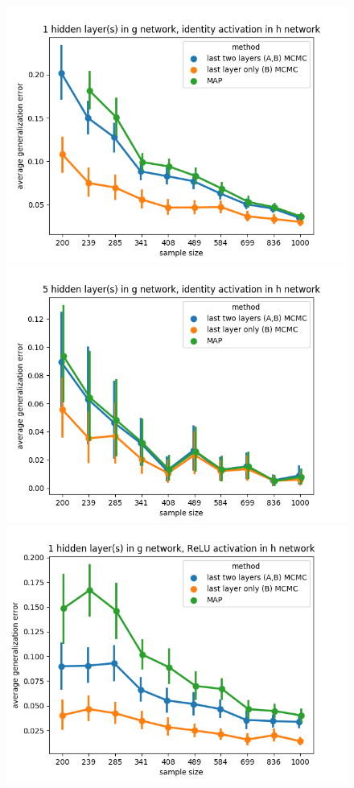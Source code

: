 \documentclass{article} %
\begin{document}
\newpage
\begin{figure}[t!]
	\begin{center}
		\includegraphics[scale=0.35]{taskid12.png}
		\includegraphics[scale=0.35]{taskid13.png}
		\includegraphics[scale=0.35]{taskid14.png}

\end{center}
\end{figure}
\end{document}
